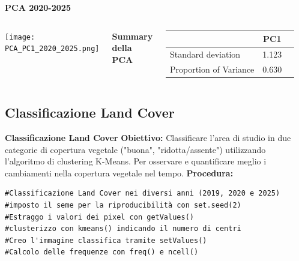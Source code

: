 \documentclass{beamer}
\begin{document}
\begin{frame}{\textbf{PCA 2020-2025}}
\begin{columns}
    \centering
    \texttt{[image: PCA\_PC1\_2020\_2025.png]}
    
    \centering
    \textbf{Summary della PCA}
    \begin{table}
        \centering
        \begin{tabular}{lcc}
            \toprule
            & PC1 \\
            \midrule
            Standard deviation     & 1.123 \\
            Proportion of Variance & 0.630 \\
            \bottomrule
        \end{tabular}
    \end{table}
\end{columns}
\end{frame}


\subsection{Classificazione Land Cover}

\begin{frame}[fragile]{\textbf{Classificazione Land Cover}}
\textbf{Obiettivo:} Classificare l'area di studio in due categorie di copertura vegetale ("buona", "ridotta/assente") utilizzando l'algoritmo di clustering K-Means. Per osservare e quantificare meglio i cambiamenti nella copertura vegetale nel tempo.
\newline
\newline
\textbf{Procedura:}
\begin{lstlisting}
#Classificazione Land Cover nei diversi anni (2019, 2020 e 2025)
#imposto il seme per la riproducibilità con set.seed(2)
#Estraggo i valori dei pixel con getValues()
#clusterizzo con kmeans() indicando il numero di centri
#Creo l'immagine classifica tramite setValues()
#Calcolo delle frequenze con freq() e ncell()
\end{lstlisting}
\end{frame}
\end{document}
